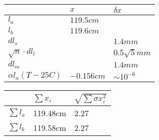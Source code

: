 \begin{tabular}{| l | l | l |}
\hline
 & $x$ & $\delta x$ \\
\hline
$l_a$                 & $119.5cm$ &    \\             
$l_b$                 & $119.6cm$ &    \\        
$dl_s$                &     & $1.4mm$   \\             
$\sqrt{n}\cdot dl_l$  &     & $0.5\sqrt{5}mm$   \\                  
$dl_m$                &     & $1.4mm$   \\                  
$\alpha l_a (T-25C)$  & $-0.156cm$ & $\sim 10^{-6}$   \\ 
\hline                

\end{tabular}

\begin{tabular}{| l | l | l |}
\hline
& $\sum x_i$ & $\sqrt {\sum \sigma x_i^2 }$ \\
\hline
$\sum l_a$ & 119.48cm & 2.27 \\
$\sum l_b$ & 119.58cm & 2.27 \\
\hline   
\end{tabular}